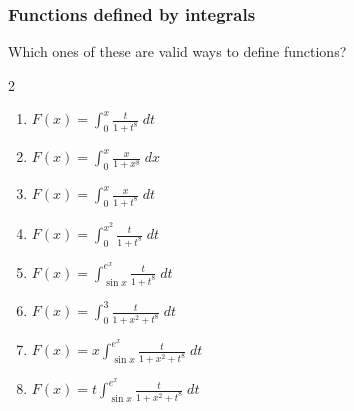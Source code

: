 \begin{frame}[t]
	\fontsize{11}{11}\selectfont
	\frametitle{Functions defined by integrals}

	Which ones of these are valid ways to define functions?

	\vspace{.1cm}

	\begin{multicols}{2}
		\begin{enumerate}
			\item $\displaystyle F(x) = \int_{0}^{x}\frac{t}{1+ t^{8}}\; dt$
				\vspace{.3cm}

			\item $\displaystyle F(x) = \int_{0}^{x}\frac{x}{1+ x^{8}}\; dx$
				\vspace{.3cm}

			\item $\displaystyle F(x) = \int_{0}^{x}\frac{x}{1+ t^{8}}\; dt$
				\vspace{.3cm}

			\item $\displaystyle F(x) = \int_{0}^{x^2}\frac{t}{1+t^{8}}\; dt$
				\vspace{.3cm}

			\item $\displaystyle F(x) = \int_{\sin x}^{e^x}\frac{t}{1+t^{8}}\; dt$
				\vspace{.3cm}

			\item $\displaystyle F(x) = \int_{0}^{3}\frac{t}{1+x^{2}+t^{8}}\; dt$
				\vspace{.3cm}

			\item $\displaystyle F(x) = x \int_{\sin x}^{e^x}\frac{t}{1+x^{2}+t^{8}}\;
				dt$
				\vspace{.3cm}

			\item $\displaystyle F(x) = t \int_{\sin x}^{e^x}\frac{t}{1+x^{2}+t^{8}}\;
				dt$
				\vspace{.3cm}
		\end{enumerate}
	\end{multicols}
\end{frame}


